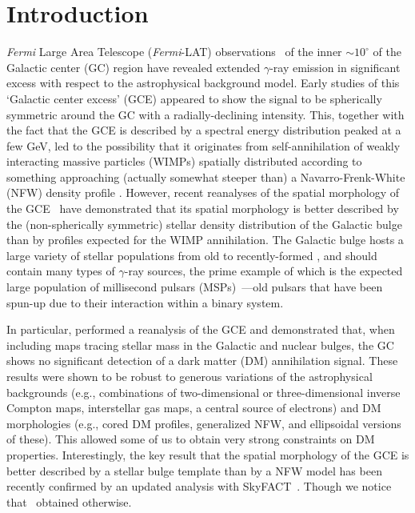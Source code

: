\documentclass[doublespace,nopageskip]{VTthesis} %
\begin{document}
\section{Introduction}
\label{sec:introduction}


\textit{Fermi} Large Area Telescope (\textit{Fermi}-LAT) observations~\citep{Hooper:2010mq,Abazajian:2010zy,Abazajian:2012pn,Gordon:2013vta, Macias:2013vya,Calore:2014xka,Daylan:2014rsa,TheFermi-LAT:2015kwa,TheFermi-LAT:2017vmf} of the inner $\sim 10^{\circ}$ of the Galactic center (GC) region have revealed extended  $\gamma$-ray emission in significant excess with respect to the astrophysical background model. Early studies of this `Galactic center excess' (GCE) appeared to show the signal to be spherically symmetric around the GC with a radially-declining intensity. This, together with the fact that the GCE is described by a 
spectral energy distribution peaked at a few GeV,
led to the possibility that it
originates from
self-annihilation of  weakly interacting massive particles (WIMPs) spatially distributed 
according to something approaching (actually somewhat steeper than)
a Navarro-Frenk-White (NFW) density profile 
\citep{Hooper:2010mq,Abazajian:2012pn,Gordon:2013vta}. However, recent reanalyses of the spatial morphology of the GCE~\citep{Macias:2016nev,Bartels:2017vsx,Macias:2019omb, Abazajian:2020tww} have demonstrated that its spatial morphology is better described by the (non-spherically symmetric) stellar density distribution of the Galactic bulge than by profiles expected for the WIMP annihilation. The Galactic bulge hosts a large variety of stellar populations from old to 
recently-formed
\citep{Garzon:1997cs,Hammersley:2000mx}, and should contain many 
types of
$\gamma$-ray sources, 
the prime example of which is the expected large population of millisecond pulsars (MSPs)~\citep{Abazajian:2010zy,Abazajian:2012pn,Gordon:2013vta,Ploeg:2017vai, Fragione:2017rsp, Fragione:2018jxd, Gonthier:2018ymi, Ploeg:2020jeh}---old pulsars that have been spun-up due to their
interaction within a binary system.

In particular, \citet{Abazajian:2020tww} performed a reanalysis of the GCE and demonstrated that, when including maps tracing stellar mass in the Galactic and nuclear bulges, the GC shows no significant detection of a dark matter (DM) annihilation signal. These results were shown to be robust to generous variations of the astrophysical backgrounds (e.g., combinations of two-dimensional or three-dimensional inverse Compton maps, interstellar gas maps, a central source of electrons) and DM morphologies (e.g., cored DM profiles, generalized NFW, and ellipsoidal versions of these). This allowed some of us to obtain very strong constraints on DM properties. Interestingly, the key result that the spatial morphology of the GCE is better described by a stellar bulge template than by a NFW model has been recently confirmed by an updated analysis with SkyFACT~\citep{Calore:2021bty}. Though we notice that~\cite{DiMauro:2021raz} obtained otherwise.
\end{document}
